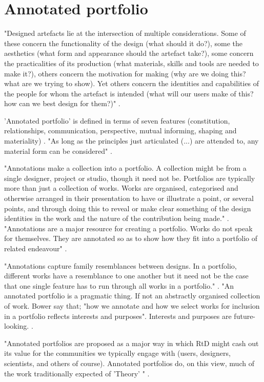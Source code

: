 \section{Annotated portfolio}

"Designed artefacts lie at the intersection of multiple considerations. Some of these concern the functionality of the design (what should it do?), some the aesthetics (what form and appearance should the artefact take?), some concern the practicalities of its production (what materials, skills and tools are needed to make it?), others concern the motivation for making (why are we doing this? what are we trying to show). Yet others concern the identities and capabilities of the people for whom the artefact is intended (what will our users make of this? how can we best design for them?)" \autocite[p. 70]{bowers_annotated_2012}. 

'Annotated portfolio' is defined in terms of seven features (constitution, relationships, communication, perspective, mutual informing, shaping and materiality) \autocite[p. 71]{bowers_annotated_2012}. "As long as the principles just articulated (...) are attended to, any material form can be considered" \autocite[p. 73]{bowers_annotated_2012}.

"Annotations make a collection into a portfolio. A collection might be from a single designer, project or studio, though it need not be. Portfolios are typically more than just a collection of works. Works are organised, categorised and otherwise arranged in their presentation to have or illustrate a point, or several points, and through doing this to reveal or make clear something of the design identities in the work and the nature of the contribution being made." \autocite[p. 71]{bowers_annotated_2012}. "Annotations are a major resource for creating a portfolio. Works do not speak for themselves. They are annotated so as to show how they fit into a portfolio of related endeavour" \autocite[p. 71]{bowers_annotated_2012}.

"Annotations capture family resemblances between designs. In a portfolio, different works have a resemblance to one another but it need not be the case that one single feature has to run through all works in a portfolio." \autocite[p. 71]{bowers_annotated_2012}. "An annotated portfolio is a pragmatic thing. If not an abstractly organised collection of work. Bower say that; "how we annotate and how we select works for inclusion in a portfolio reflects interests and purposes". Interests and purposes are future-looking. \autocite[p. 73]{bowers_annotated_2012}.

"Annotated portfolios are proposed as a major way in which RtD might cash out its value for the communities we typically engage with (users, designers, scientists, and others of course). Annotated portfolios do, on this view, much of the work traditionally expected of 'Theory' " \autocite[p. 73]{bowers_annotated_2012}.
